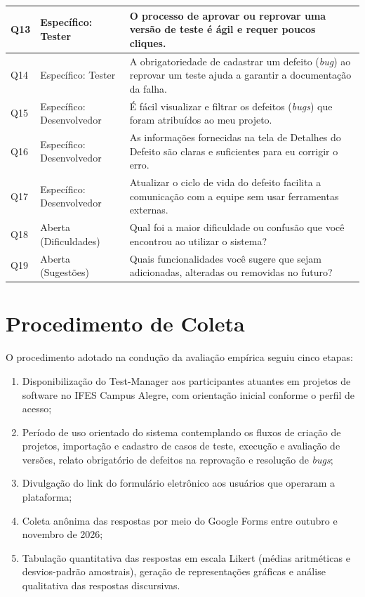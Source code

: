 \begin{quadro}[!htb]
\begin{tabularx}{\textwidth}{|p{1.1cm}|p{3.3cm}|X|}
Q13 & Específico: Tester & O processo de aprovar ou reprovar uma versão de teste é ágil e requer poucos cliques. \\ \hline
Q14 & Específico: Tester & A obrigatoriedade de cadastrar um defeito (\textit{bug}) ao reprovar um teste ajuda a garantir a documentação da falha. \\ \hline
Q15 & Específico: Desenvolvedor & É fácil visualizar e filtrar os defeitos (\textit{bugs}) que foram atribuídos ao meu projeto. \\ \hline
Q16 & Específico: Desenvolvedor & As informações fornecidas na tela de Detalhes do Defeito são claras e suficientes para eu corrigir o erro. \\ \hline
Q17 & Específico: Desenvolvedor & Atualizar o ciclo de vida do defeito facilita a comunicação com a equipe sem usar ferramentas externas. \\ \hline
Q18 & Aberta (Dificuldades) & Qual foi a maior dificuldade ou confusão que você encontrou ao utilizar o sistema? \\ \hline
Q19 & Aberta (Sugestões) & Quais funcionalidades você sugere que sejam adicionadas, alteradas ou removidas no futuro? \\ \hline
\end{tabularx}
\end{quadro}

\section{Procedimento de Coleta}

O procedimento adotado na condução da avaliação empírica seguiu cinco etapas:
\begin{enumerate}
    \item Disponibilização do Test-Manager aos participantes atuantes em projetos de software no IFES Campus Alegre, com orientação inicial conforme o perfil de acesso;
    \item Período de uso orientado do sistema contemplando os fluxos de criação de projetos, importação e cadastro de casos de teste, execução e avaliação de versões, relato obrigatório de defeitos na reprovação e resolução de \textit{bugs};
    \item Divulgação do link do formulário eletrônico aos usuários que operaram a plataforma;
    \item Coleta anônima das respostas por meio do Google Forms entre outubro e novembro de 2026;
    \item Tabulação quantitativa das respostas em escala Likert (médias aritméticas e desvios-padrão amostrais), geração de representações gráficas e análise qualitativa das respostas discursivas.
\end{enumerate}

